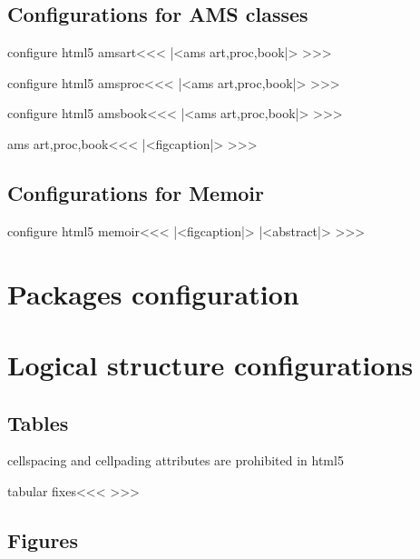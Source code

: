 \section{Configurations for AMS classes}

\<configure html5 amsart\><<<
|<ams art,proc,book|>
>>>

\<configure html5 amsproc\><<<
|<ams art,proc,book|>
>>>

\<configure html5 amsbook\><<<
|<ams art,proc,book|>
>>>


\<ams art,proc,book\><<<
|<figcaption|>
>>>

\section{Configurations for Memoir}

\<configure html5 memoir\><<<
|<figcaption|>
|<abstract|>
>>>

\chapter{Packages configuration}

\chapter{Logical structure configurations}

\section{Tables}

cellspacing and cellpading attributes are prohibited in html5

\<tabular fixes\><<<
>>>

\section{Figures}

